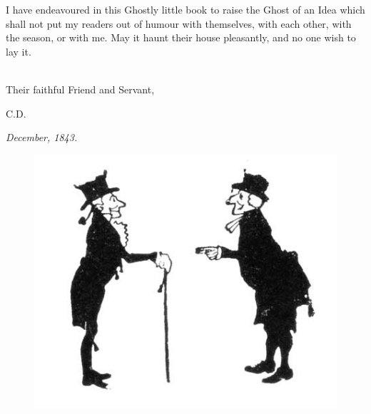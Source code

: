 
\lettrine[lines=4]{I}{} have endeavoured in this Ghostly little book to raise the Ghost of an Idea which shall not put my readers out of humour with themselves, with each other, with the season, or with me. May it haunt their house pleasantly, and no one wish to lay it.

~\\

Their faithful Friend and Servant,

\begin{flushright}
\textsc{C.D.}
\end{flushright}

\textit{December, 1843.}
\vfill
\begin{figure}[h]
\centering
\includegraphics[width=.5\textwidth]{gs007}
\caption[Tailpiece to Preface]{}
\end{figure}